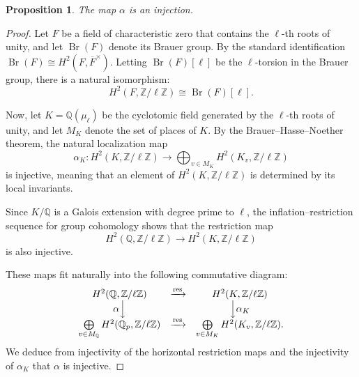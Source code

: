 \documentclass[11pt,reqno]{amsart}
\newtheorem{proposition}[theorem]{Proposition}
\newcommand{\Z}{\mathbb{Z}}
\newcommand{\Q}{\mathbb{Q}}
\newcommand{\op}[1]{\operatorname{#1}}
\numberwithin{equation}{section}
\begin{document}
\begin{proposition}\label{ H2 injection }
    The map $\alpha$ is an injection.
\end{proposition}
\begin{proof}
    Let \( F \) be a field of characteristic zero that contains the \(\ell\)-th roots of unity, and let \(\op{Br}(F)\) denote its Brauer group. By the standard identification \(\op{Br}(F) \cong H^2(F, \overline{F}^\times)\). Letting \(\op{Br}(F)[\ell]\) be the \(\ell\)-torsion in the Brauer group, there is a natural isomorphism:
\[
H^2(F, \Z/\ell\Z) \cong \op{Br}(F)[\ell].
\]  

\noindent Now, let \( K = \Q(\mu_\ell) \) be the cyclotomic field generated by the \(\ell\)-th roots of unity, and let \( M_K \) denote the set of places of \( K \). By the Brauer–Hasse–Noether theorem, the natural localization map  
\[
\alpha_K: H^2(K, \Z/\ell\Z) \longrightarrow \bigoplus_{v \in M_K} H^2(K_v, \Z/\ell\Z)
\]  
is injective, meaning that an element of \( H^2(K, \Z/\ell\Z) \) is determined by its local invariants.  

Since \( K/\Q \) is a Galois extension with degree prime to \(\ell\), the inflation–restriction sequence for group cohomology shows that the restriction map  
\[
H^2(\Q, \Z/\ell\Z) \longrightarrow H^2(K, \Z/\ell\Z)
\]  
is also injective.  

 These maps fit naturally into the following commutative diagram:  
\[
\begin{array}{ccc}
H^2(\Q, \Z/\ell\Z) & \xrightarrow{\operatorname{res}} & H^2(K, \Z/\ell\Z) \\
\alpha \Big\downarrow & & \Big\downarrow \alpha_K \\
\bigoplus\limits_{v \in M_\Q} H^2(\Q_p, \Z/\ell\Z) & \xrightarrow{\operatorname{res}} & \bigoplus\limits_{v \in M_K} H^2(K_v, \Z/\ell\Z).
\end{array}
\]
We deduce from injectivity of the horizontal restriction maps and the injectivity of $\alpha_K$ that $\alpha$ is injective.
\end{proof}
\end{document}
